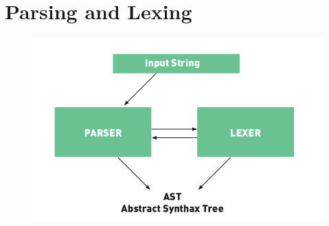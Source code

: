 \chapter{ Parsing and Lexing }

\begin{figure}[H]

	\centering
	\includegraphics[width=1.4\textwidth,center]{Immagini/ParseLex.png}
	
\end{figure}